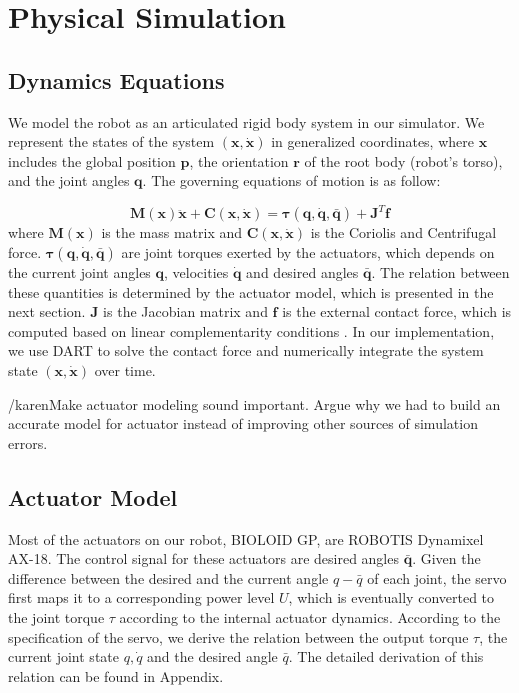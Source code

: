 \section{Physical Simulation}

\subsection{Dynamics Equations}

We model the robot as an articulated rigid body system in our simulator. We represent the states of the system $(\mathbf{x}, \dot{\mathbf{x}})$ in generalized coordinates, where $\mathbf{x}$ includes the global position $\mathbf{p}$, the orientation $\mathbf{r}$ of the root body (robot's torso), and the joint angles $\mathbf{q}$. The governing equations of motion is as follow:

\begin{equation}
\label{eq:robotdynamics}
\mathbf{M}(\mathbf{x})\mathbf{\ddot{x}}+\mathbf{C}(\mathbf{x},\mathbf{\dot{x}})=\boldsymbol{\tau}(\mathbf{q}, \dot{\mathbf{q}}, \bar{\mathbf{q}})+\mathbf{J}^T\mathbf{f}
\end{equation}
where $\mathbf{M}(\mathbf{x})$ is the mass matrix and $\mathbf{C}(\mathbf{x},\mathbf{\dot{x}})$ is the Coriolis and Centrifugal force. $\boldsymbol{\tau}(\mathbf{q}, \dot{\mathbf{q}}, \bar{\mathbf{q}})$ are joint torques exerted by the actuators, which depends on the current joint angles $\mathbf{q}$, velocities $\dot{\mathbf{q}}$ and desired angles $\bar{\mathbf{q}}$. The relation between these quantities is determined by the actuator model, which is presented in the next section. $\mathbf{J}$ is the Jacobian matrix and $\mathbf{f}$ is the external contact force, which is computed based on linear complementarity conditions \cite{Tan:2012b}. In our implementation, we use DART to solve the contact force and numerically integrate the system state $(\mathbf{x}, \dot{\mathbf{x}})$ over time.

/karen{Make actuator modeling sound important. Argue why we had to build an accurate model for actuator instead of improving other sources of simulation errors.}

\subsection{Actuator Model}
\label{sec:motorDynamics}
Most of the actuators on our robot, BIOLOID GP, are ROBOTIS Dynamixel AX-18. The control signal for these actuators are desired angles $\bar{\mathbf{q}}$. Given the difference between the desired and the current angle ${q-\bar{q}}$ of each joint, the servo first maps it to a corresponding power level $U$, which is eventually converted to the joint torque $\tau$ according to the internal actuator dynamics. According to the specification of the servo, we derive the relation between the output torque $\tau$, the current joint state $q, \dot{q}$ and the desired angle $\bar{q}$. The detailed derivation of this relation can be found in Appendix.

